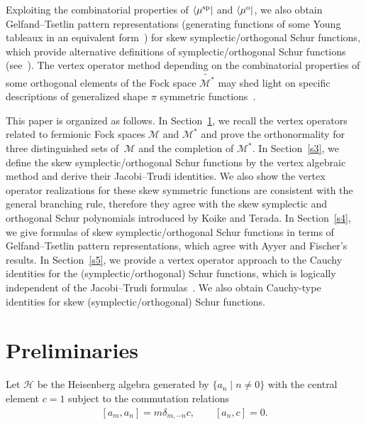 \documentclass[pdftex]{sigma}
\numberwithin{equation}{section}
\begin{document}
Exploiting the combinatorial properties of $\langle\mu^{\rm sp}|$ and $\langle\mu^{\rm o}|$, we also obtain Gelfand--Tsetlin pattern representations (generating
functions of some Young tableaux in an equivalent form~\cite{Sta1999}) for skew symplectic/orthogonal Schur functions, which provide alternative definitions of
symplectic/orthogonal Schur functions (see~\cite{AF2020}). The vertex operator method depending on the combinatorial properties of some orthogonal elements of the Fock space $\widetilde{\mathcal{M}^*}$ may shed light on specific descriptions of generalized shape $\pi$ symmetric functions~\cite{FJK2010}.

This paper is organized as follows. In Section~\ref{s2}, we recall the vertex operators related to fermionic Fock spaces $\mathcal{M}$ and $\mathcal{M}^*$
and prove the orthonormality for three distinguished sets of~$\mathcal{M}$ and the completion of $\mathcal{M}^*$. In Section~\ref{s3}, we define the skew symplectic/orthogonal Schur functions by the vertex algebraic method and derive their Jacobi--Trudi identities. We also show the vertex operator realizations for these skew symmetric functions are consistent with the general branching rule, therefore they agree with the skew symplectic and orthogonal Schur polynomials introduced by Koike and Terada. In Section~\ref{s4}, we give formulas of skew symplectic/orthogonal Schur functions in terms of Gelfand--Tsetlin pattern representations, which agree with Ayyer and Fischer's results. In Section~\ref{s5}, we provide a vertex operator approach to the Cauchy identities for the (symplectic/orthogonal) Schur functions, which is logically independent of the
Jacobi--Trudi formulas~\cite{JR2016}. We also obtain Cauchy-type identities for skew (symplectic/orthogonal) Schur functions.

\section{Preliminaries}\label{s2}

Let $\mathcal{H}$ be the Heisenberg algebra generated by $\{a_n\mid n\neq 0\}$ with the central element $c=1$ subject to the commutation relations \cite{FK1980}
\begin{align}\label{e:he1}
[a_m,a_n]=m\delta_{m,-n}c,\qquad [a_n,c]=0.
\end{align}
\end{document}
